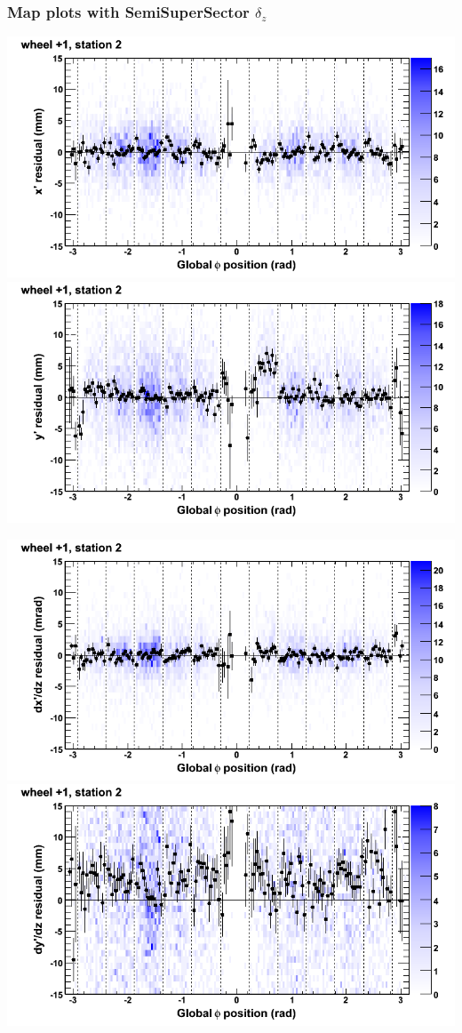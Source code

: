 \documentclass[compress]{beamer}
\begin{document}
\begin{frame}
\frametitle{Map plots with SemiSuperSector $\delta_z$}
\includegraphics[width=0.5\linewidth]{zfit_mapplots/DTvsphi_st2whD_x.png}
\includegraphics[width=0.5\linewidth]{zfit_mapplots/DTvsphi_st2whD_y.png}

\includegraphics[width=0.5\linewidth]{zfit_mapplots/DTvsphi_st2whD_dxdz.png}
\includegraphics[width=0.5\linewidth]{zfit_mapplots/DTvsphi_st2whD_dydz.png}
\end{frame}
\end{document}
